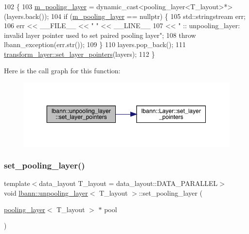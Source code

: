 \begin{DoxyCode}
102                                                              \{
103     \hyperlink{classlbann_1_1unpooling__layer_ab15a8b0680685f80c7d995e617e97a9a}{m\_pooling\_layer} = \textcolor{keyword}{dynamic\_cast<}pooling\_layer<T\_layout>*\textcolor{keyword}{>}(layers.back());
104     \textcolor{keywordflow}{if} (\hyperlink{classlbann_1_1unpooling__layer_ab15a8b0680685f80c7d995e617e97a9a}{m\_pooling\_layer} == \textcolor{keyword}{nullptr}) \{
105       std::stringstream err;
106       err << \_\_FILE\_\_ << \textcolor{stringliteral}{" "} << \_\_LINE\_\_ 
107           << \textcolor{stringliteral}{" :: unpooling\_layer: invalid layer pointer used to set paired pooling layer"};
108       \textcolor{keywordflow}{throw} lbann\_exception(err.str());
109     \}
110     layers.pop\_back();
111     \hyperlink{classlbann_1_1Layer_a001ea76cdd05e2d0d475f408f24702ee}{transform\_layer::set\_layer\_pointers}(layers);
112   \}
\end{DoxyCode}
Here is the call graph for this function\+:\nopagebreak
\begin{figure}[H]
\begin{center}
\leavevmode
\includegraphics[width=350pt]{classlbann_1_1unpooling__layer_aacc3a2fdd75ecee8614a00a85697a763_cgraph}
\end{center}
\end{figure}
\mbox{\label{classlbann_1_1unpooling__layer_a5269d1939056430c0d8033629a770b38}} 
\subsubsection{\texorpdfstring{set\+\_\+pooling\+\_\+layer()}{set\_pooling\_layer()}}
{\footnotesize\ttfamily template$<$data\+\_\+layout T\+\_\+layout = data\+\_\+layout\+::\+D\+A\+T\+A\+\_\+\+P\+A\+R\+A\+L\+L\+EL$>$ \\
void \hyperlink{classlbann_1_1unpooling__layer}{lbann\+::unpooling\+\_\+layer}$<$ T\+\_\+layout $>$\+::set\+\_\+pooling\+\_\+layer (\begin{DoxyParamCaption}\item[{\hyperlink{classlbann_1_1pooling__layer}{pooling\+\_\+layer}$<$ T\+\_\+layout $>$ $\ast$}]{pool }\end{DoxyParamCaption})\hspace{0.3cm}{\ttfamily [inline]}}



